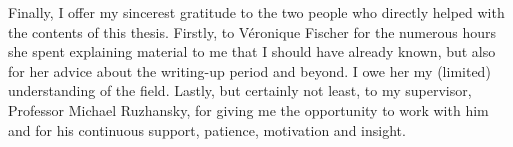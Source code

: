 Finally, I offer my sincerest gratitude to the two people who directly helped with the contents of this thesis.
Firstly, to V\'eronique Fischer for the numerous hours she spent
explaining material to me that I should have already known,
but also for her advice about the writing-up period and beyond.
I owe her my (limited) understanding of the field.
Lastly, but certainly not least,
to my supervisor,
Professor Michael Ruzhansky,
for giving me the opportunity to work with him and for his continuous support, patience, motivation and insight.
